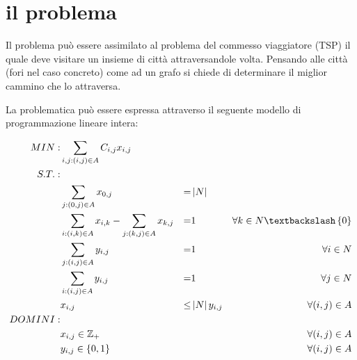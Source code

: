 %
%
\section{il problema}
\label{pt1:problem}
Il problema può essere assimilato al problema del commesso viaggiatore (TSP) il quale deve visitare un insieme di città attraversandole  volta. Pensando alle città (fori nel caso concreto) come ad un grafo si chiede di determinare il miglior cammino  che lo attraversa.

La problematica può essere espressa attraverso il seguente modello di programmazione lineare intera:

\begin{align}
MIN: &\sum_{i,j:(i,j) \in A} C_{i,j}x_{i,j} \\
S.T.: \nonumber \\ 
&\sum_{j:(0,j) \in A} x_{0,j} &=&\left|N\right|& \\
&\sum_{i:(i,k) \in A} x_{i,k} - \sum_{j:(k,j) \in A} x_{k,j} &=&1 &\forall k \in N \textbackslash \left\{0\right\} \\
&\sum_{j:(i,j) \in A} y_{i,j} &=&1 &\forall i \in N \\
&\sum_{i:(i,j) \in A} y_{i,j} &=&1 &\forall j \in N \\
&x_{i,j} &\le&\left|N\right|y_{i,j} &\forall (i,j) \in A\\
DOMINI: \nonumber \\ 
&x_{i,j} \in \mathbb{Z}_{+} &&& \forall (i,j) \in A\\
&y_{i,j} \in \left\{0, 1\right\} &&& \forall (i, j) \in A
\end{align}